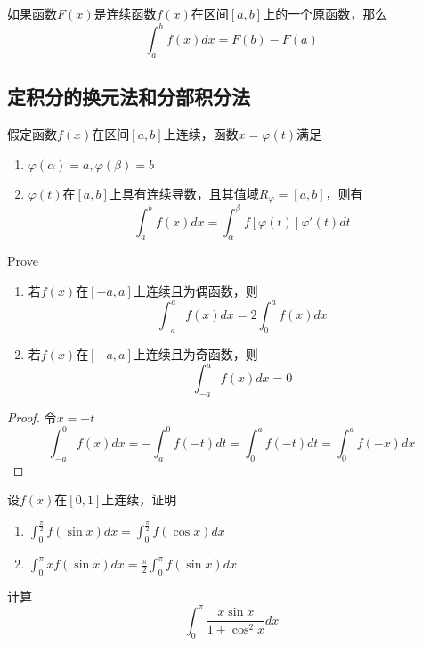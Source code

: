 \documentclass[11pt]{article}
\begin{document}
\begin{theorem}[微积分基本定理]
如果函数\(F(x)\)是连续函数\(f(x)\)在区间\([a,b]\)上的一个原函数，那么
\begin{equation*}
\int_a^bf(x)dx=F(b)-F(a)
\end{equation*}
\end{theorem}
\subsection{定积分的换元法和分部积分法}
\label{sec:org19a75e4}
\begin{theorem}[]
假定函数\(f(x)\)在区间\([a,b]\)上连续，函数\(x=\varphi(t)\)满足
\begin{enumerate}
\item \(\varphi(\alpha)=a,\varphi(\beta)=b\)
\item \(\varphi(t)\)在\([a,b]\)上具有连续导数，且其值域\(R_\varphi=[a,b]\)，则有
\begin{equation*}
\int_a^bf(x)dx=\int_\alpha^\beta f[\varphi(t)]\varphi'(t)dt
\end{equation*}
\end{enumerate}
\end{theorem}

\begin{proposition}[]
Prove
\begin{enumerate}
\item 若\(f(x)\)在\([-a,a]\)上连续且为偶函数，则
\begin{equation*}
\int_{-a}^af(x)dx=2\int_0^af(x)dx
\end{equation*}
\item 若\(f(x)\)在\([-a,a]\)上连续且为奇函数，则
\begin{equation*}
\int_{-a}^af(x)dx=0
\end{equation*}
\end{enumerate}
\end{proposition}

\begin{proof}
令\(x=-t\)
\begin{equation*}
\int_{-a}^0f(x)dx=-\int_{a}^0f(-t)dt=\int_0^af(-t)dt=\int_0^af(-x)dx
\end{equation*}
\end{proof}

\begin{proposition}[]
设\(f(x)\)在\([0,1]\)上连续，证明
\begin{enumerate}
\item \(\int_0^{\frac{\pi}{2}}f(\sin x)dx=\int_0^{\frac{\pi}{2}}f(\cos x)dx\)
\item \(\int_0^\pi xf(\sin x)dx=\frac{\pi}{2}\int_0^\pi f(\sin x)dx\)
\end{enumerate}


计算
\begin{equation*}
\int_0^\pi\frac{x\sin x}{1+\cos^2x}dx
\end{equation*}
\end{proposition}
\end{document}
